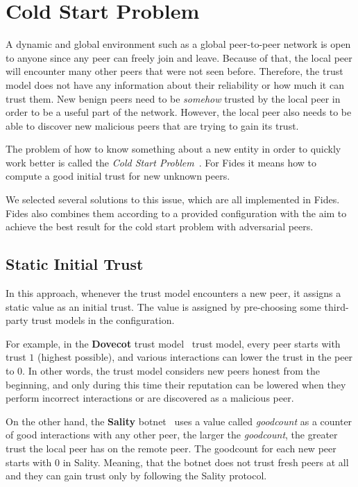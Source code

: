 \section{Cold Start Problem}
\label{sec:cold-start-problem}
A dynamic and global environment such as a global peer-to-peer network is open to anyone since any peer can freely join and leave. Because of that, the local peer will encounter many other peers that were not seen before. Therefore, the trust model does not have any information about their reliability or how much it can trust them. 
New benign peers need to be \textit{somehow} trusted by the local peer in order to be a useful part of the network. However, the local peer also needs to be able to discover new malicious peers that are trying to gain its trust.

The problem of how to know something about a new entity in order to quickly work better is called the \textit{Cold Start Problem}~\cite{christensen2014hybrid}. For Fides it means how to compute a good initial trust for new unknown peers. 

We selected several solutions to this issue, which are all implemented in Fides. Fides also combines them according to a provided configuration with the aim to achieve the best result for the cold start problem with adversarial peers.

\subsection{Static Initial Trust}
\label{subsec:static-initial-trust}
In this approach, whenever the trust model encounters a new peer, it assigns a static value as an initial trust. The value is assigned by pre-choosing some third-party trust models in the configuration.

For example, in the \textbf{Dovecot} trust model~\cite{dita} trust model, every peer starts with trust $1$ (highest possible), and various interactions can lower the trust in the peer to $0$. In other words, the trust model considers new peers honest from the beginning, and only during this time their reputation can be lowered when they perform incorrect interactions or are discovered as a malicious peer.

On the other hand, the \textbf{Sality} botnet~\cite{falliere2011sality} uses a value called \textit{goodcount} as a counter of good interactions with any other peer, the larger the \textit{goodcount}, the greater trust the local peer has on the remote peer. The goodcount for each new peer starts with $0$ in Sality. Meaning, that the botnet does not trust fresh peers at all and they can gain trust only by following the Sality protocol.

